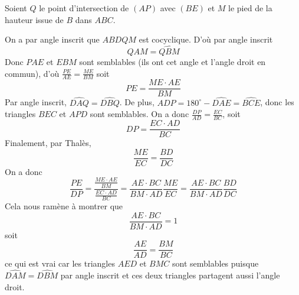Soient $Q$ le point d'intersection de $(AP)$ avec $(BE)$ et $M$ le pied de la hauteur issue de $B$ dans $ABC$.

On a par angle inscrit que $ABDQM$ est cocyclique. D'où par angle inscrit
$$\widehat{QAM} = \widehat{QBM}$$
Donc $PAE$ et $EBM$ sont semblables (ils ont cet angle et l'angle droit en commun), d'où $\frac{PE}{AE} = \frac{ME}{BM}$ soit
$$PE = \frac{ME\cdot AE}{BM}$$
Par angle inscrit, $\widehat{DAQ} = \widehat{DBQ}$. De plus, $\widehat{ADP} = 180^\circ - \widehat{DAE} = \widehat{BCE}$, donc les triangles $BEC$ et $APD$ sont semblables. On a donc $\frac{DP}{AD} = \frac{EC}{BC}$, soit
$$DP = \frac{EC\cdot AD}{BC}$$
Finalement, par Thalès,
$$\frac{ME}{EC} = \frac{BD}{DC}$$
On a donc
$$\frac{PE}{DP} = \frac{\frac{ME\cdot AE}{BM}}{\frac{EC\cdot AD}{BC}} = \frac{AE\cdot BC}{BM\cdot AD}\frac{ME}{EC} = \frac{AE\cdot BC}{BM\cdot AD}\frac{BD}{DC}$$
Cela nous ramène à montrer que
$$\frac{AE\cdot BC}{BM\cdot AD} = 1$$
soit
$$\frac{AE}{AD} = \frac{BM}{BC}$$
ce qui est vrai car les triangles $AED$ et $BMC$ sont semblables puisque $\widehat{DAM} = \widehat{DBM}$ par angle inscrit et ces deux triangles partagent aussi l'angle droit.